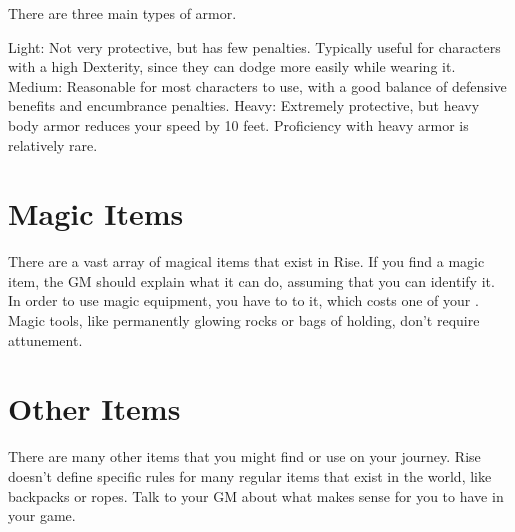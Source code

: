   There are three main types of armor.
  \begin{raggeditemize}
    Light: Not very protective, but has few penalties. Typically useful for characters with a high Dexterity, since they can dodge more easily while wearing it.
    Medium: Reasonable for most characters to use, with a good balance of defensive benefits and encumbrance penalties.
    Heavy: Extremely protective, but heavy body armor reduces your speed by 10 feet. Proficiency with heavy armor is relatively rare.
  \end{raggeditemize}

\section{Magic Items}
  There are a vast array of magical items that exist in Rise.
  If you find a magic item, the GM should explain what it can do, assuming that you can identify it.
  In order to use magic equipment, you have to  to it, which costs one of your .
  Magic tools, like permanently glowing rocks or bags of holding, don't require attunement.

\section{Other Items}
  There are many other items that you might find or use on your journey.
  Rise doesn't define specific rules for many regular items that exist in the world, like backpacks or ropes.
  Talk to your GM about what makes sense for you to have in your game.
